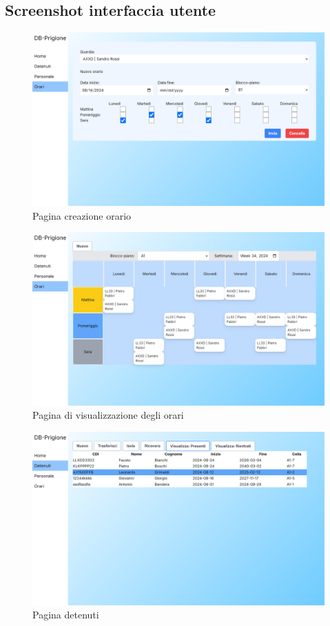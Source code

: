 \documentclass[a4paper,12pt]{report}
\begin{document}
\subsection{Screenshot interfaccia utente}
\begin{figure}[H]
\caption{Pagina creazione orario}
\includegraphics[width=\textheight, height=0.75\textwidth, keepaspectratio, angle=90,origin=c]{creazione_orario.png}  
\end{figure}
\begin{figure}[H]
\caption{Pagina di visualizzazione degli orari}  
\includegraphics[width=\textheight, keepaspectratio, angle=90,origin=c]{pagina-orario.png}
\end{figure}
\begin{figure}[H]
\caption{Pagina detenuti}  
\includegraphics[width=\textheight, keepaspectratio, angle=90,origin=c]{pagina_detenuti.png}
\end{figure}
\end{document}
